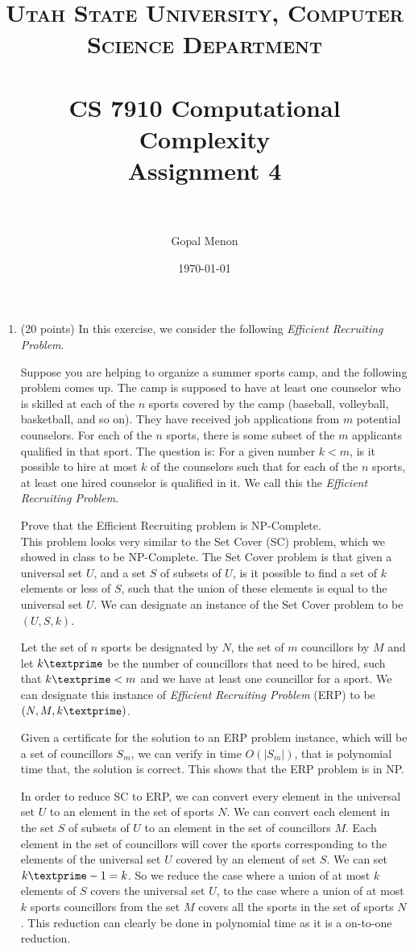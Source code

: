 \documentclass[paper=a4, fontsize=11pt]{scrartcl} %
\title{	
\normalfont \normalsize 
\textsc{Utah State University, Computer Science Department} \\ [25pt] %
\horrule{0.5pt} \\[0.4cm] %
\huge CS 7910 Computational Complexity\\Assignment 4 \\ %
\horrule{2pt} \\[0.5cm] %
}
\author{Gopal Menon} %
\date{\normalsize\today} %
\numberwithin{equation}{section} %
\numberwithin{figure}{section} %
\numberwithin{table}{section} %
\begin{document}
\maketitle %

\begin{enumerate}
\item (20 points) In this exercise, we consider the following \textit{Efficient Recruiting Problem}.

Suppose you are helping to organize a summer sports camp, and the following problem comes up. The camp is supposed to have at least one counselor who is skilled at each of the $n$ sports covered by the camp (baseball, volleyball, basketball, and so on). They have received job applications from $m$ potential counselors. For each of the $n$ sports, there is some subset of the $m$ applicants qualified in that sport. The question is: For a given number $k < m$, is it possible to hire at most $k$ of the counselors such that for each of the $n$ sports, at least one hired counselor is qualified in it. We call this the \textit{Efficient Recruiting Problem}.

Prove that the Efficient Recruiting problem is NP-Complete.\\

This problem looks very similar to the Set Cover (SC) problem, which we showed in class to be NP-Complete. The Set Cover problem is that given a universal set $U$, and a set $S$ of subsets of $U$, is it possible to find a set of $k$ elements or less of $S$, such that the union of these elements is equal to the universal set $U$. We can designate an instance of the Set Cover problem to be $(U, S, k)$.

Let the set of $n$ sports be designated by $N$, the set of $m$ councillors by $M$ and let $k\textprime$ be the number of councillors that need to be hired, such that $k\textprime < m$ and we have at least one councillor for a sport. We can designate this instance of \textit{Efficient Recruiting Problem} (ERP) to be $(N, M, k\textprime)$.

Given a certificate for the solution to an ERP problem instance, which will be a set of councillors $S_m$, we can verify in time $O(\left | S_m \right |)$, that is polynomial time that, the solution is correct. This shows that the ERP problem is in NP.

In order to reduce SC to ERP, we can convert every element in the universal set $U$ to an element in the set of sports $N$. We can convert each element in the set $S$ of subsets of $U$ to an element in the set of councillors $M$. Each element in the set of councillors will cover the sports corresponding to the elements of the universal set $U$ covered by an element of set $S$. We can set $k\textprime - 1 = k$. So we reduce the case where a union of at most $k$ elements of $S$ covers the universal set $U$, to the case where a union of at most $k$ sports councillors from the set $M$ covers all the sports in the set of sports $N$. This reduction can clearly be done in polynomial time as it is a on-to-one reduction.


\end{enumerate}
\end{document}
